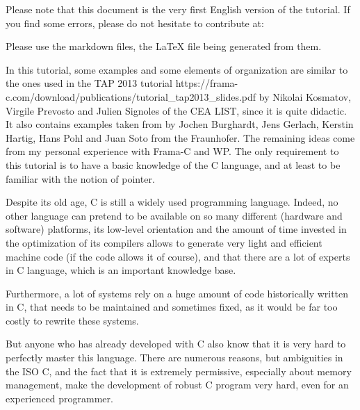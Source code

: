 \begin{Warning}
  Please note that this document is the very first English version of the
  tutorial. If you find some errors, please do not hesitate to contribute at:


  Please use the markdown files, the LaTeX file being generated from them.
\end{Warning}


\begin{Information}
  In this tutorial, some examples and some elements of organization are
  similar to the ones used in the 
  \externalLink
      {TAP 2013 tutorial}
      {https://frama-c.com/download/publications/tutorial_tap2013_slides.pdf} 
  by Nikolai Kosmatov, Virgile Prevosto and Julien
  Signoles of the CEA LIST, since it is quite didactic. It also
  contains examples taken from
  \textit{}
  by Jochen Burghardt, Jens Gerlach, Kerstin Hartig, Hans Pohl and Juan
  Soto from the Fraunhofer. The remaining ideas come from my personal
  experience with Frama-C and WP. The only requirement to this tutorial
  is to have a basic knowledge of the C language, and at least to
  be familiar with the notion of pointer.
\end{Information}


Despite its old age, C is still a widely used programming language.
Indeed, no other language can pretend to be available on so many
different (hardware and software) platforms, its low-level orientation
and the amount of time invested in the optimization of its compilers
allows to generate very light and efficient machine code (if the code
allows it of course), and that there are a lot of experts in C language,
which is an important knowledge base.


Furthermore, a lot of systems rely on a huge amount of code historically
written in C, that needs to be maintained and sometimes fixed, as it
would be far too costly to rewrite these systems.


But anyone who has already developed with C also know that it is very
hard to perfectly master this language. There are numerous reasons, but
ambiguities in the ISO C, and the fact that it is extremely permissive,
especially about memory management, make the development of robust C
program very hard, even for an experienced programmer.



